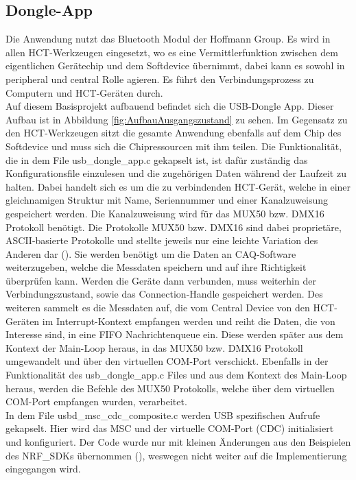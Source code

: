\subsection{Dongle-App}
Die Anwendung nutzt das Bluetooth Modul der Hoffmann Group. Es wird in allen \ac{HCT}-Werkzeugen eingesetzt, wo es eine Vermittlerfunktion zwischen dem eigentlichen Gerätechip und dem Softdevice übernimmt, dabei kann es sowohl in peripheral und central Rolle agieren. Es führt den Verbindungsprozess zu Computern und \ac{HCT}-Geräten durch. \\
Auf diesem Basisprojekt aufbauend befindet sich die \ac{USB}-Dongle App. Dieser Aufbau ist in Abbildung \ref{fig:AufbauAusgangszustand} zu sehen. Im Gegensatz zu den \ac{HCT}-Werkzeugen sitzt die gesamte Anwendung ebenfalls auf dem Chip des Softdevice und muss sich die Chipressourcen mit ihm teilen. Die Funktionalität, die in dem File usb\_dongle\_app.c gekapselt ist, ist dafür zuständig das Konfigurationsfile einzulesen und die zugehörigen Daten während der Laufzeit zu halten. Dabei handelt sich es um die zu verbindenden \ac{HCT}-Gerät, welche in einer gleichnamigen Struktur mit Name, Seriennummer und einer Kanalzuweisung gespeichert werden. Die Kanalzuweisung wird für das MUX50 bzw. DMX16 Protokoll benötigt. Die Protokolle MUX50 bzw. DMX16 sind dabei proprietäre, \ac{ASCII}-basierte Protokolle und stellte jeweils nur eine leichte Variation des Anderen dar (\cite[s. 33]{HCT_Windows_App_Manual}). Sie werden benötigt um die Daten an \ac{CAQ}-Software weiterzugeben, welche die Messdaten speichern und auf ihre Richtigkeit überprüfen kann. Werden die Geräte dann verbunden, muss weiterhin der Verbindungszustand, sowie das Connection-Handle gespeichert werden. Des weiteren sammelt es die Messdaten auf, die vom Central Device von den \ac{HCT}-Geräten im Interrupt-Kontext empfangen werden und reiht die Daten, die von Interesse sind, in eine \ac{FIFO} Nachrichtenqueue ein. Diese werden später aus dem Kontext der Main-Loop heraus, in das MUX50 bzw. DMX16 Protokoll umgewandelt und über den virtuellen COM-Port verschickt. Ebenfalls in der Funktionalität des usb\_dongle\_app.c Files und aus dem Kontext des Main-Loop heraus, werden die Befehle des MUX50 Protokolls, welche über dem virtuellen COM-Port empfangen wurden, verarbeitet.\\
In dem File usbd\_msc\_cdc\_composite.c werden \ac{USB} spezifischen Aufrufe gekapselt. Hier wird das \ac{MSC} und der virtuelle COM-Port (\ac{CDC}) initialisiert und konfiguriert. Der Code wurde nur mit kleinen Änderungen aus den Beispielen des NRF\_SDKs übernommen (\cite{NRF_USB_examples}), weswegen nicht weiter auf die Implementierung eingegangen wird.\\
